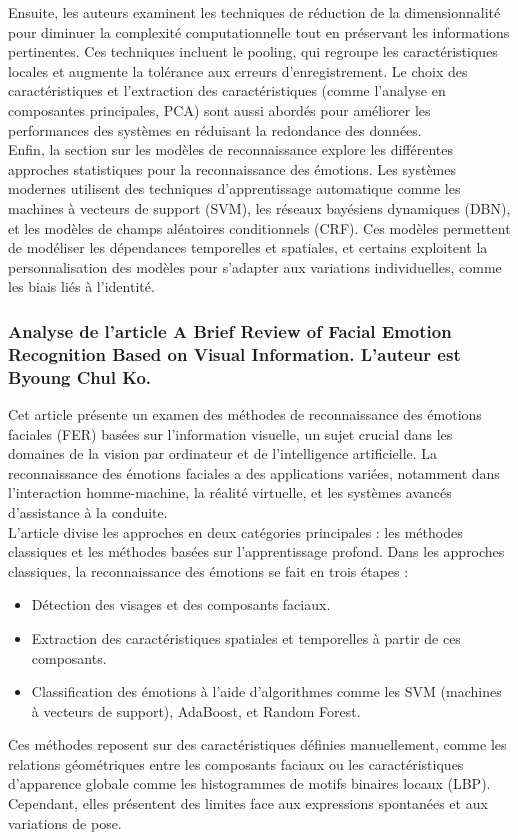 \documentclass{rapport}
\begin{document}
Ensuite, les auteurs examinent les techniques de réduction de la dimensionnalité
pour diminuer la complexité computationnelle tout en préservant les informations
pertinentes. Ces techniques incluent le pooling, qui regroupe les caractéristiques
locales et augmente la tolérance aux erreurs d'enregistrement. Le choix des
caractéristiques et l'extraction des caractéristiques (comme l'analyse en
composantes principales, PCA) sont aussi abordés pour améliorer les performances
des systèmes en réduisant la redondance des données.\\

Enfin, la section sur les modèles de reconnaissance explore les différentes
approches statistiques pour la reconnaissance des émotions. Les systèmes modernes
utilisent des techniques d'apprentissage automatique comme les machines à vecteurs
de support (SVM), les réseaux bayésiens dynamiques (DBN), et les modèles de champs
aléatoires conditionnels (CRF). Ces modèles permettent de modéliser les dépendances
temporelles et spatiales, et certains exploitent la personnalisation des modèles
pour s’adapter aux variations individuelles, comme les biais liés à l'identité.

\subsubsection{Analyse de l'article \cite{koBriefReviewFacial2018} A Brief Review of Facial Emotion Recognition Based on Visual Information. L'auteur est Byoung Chul Ko.}

Cet article présente un examen des méthodes de reconnaissance des émotions faciales
(FER) basées sur l'information visuelle, un sujet crucial dans les domaines de la
vision par ordinateur et de l'intelligence artificielle. La reconnaissance des
émotions faciales a des applications variées, notamment dans l'interaction
homme-machine, la réalité virtuelle, et les systèmes avancés d'assistance à la conduite.\\

L'article divise les approches en deux catégories principales : les méthodes classiques
et les méthodes basées sur l'apprentissage profond. Dans les approches classiques,
la reconnaissance des émotions se fait en trois étapes :
\begin{itemize}
    \item Détection des visages et des composants faciaux.
    \item Extraction des caractéristiques spatiales et temporelles à partir de ces composants.
    \item Classification des émotions à l'aide d'algorithmes comme les SVM (machines à vecteurs de support), AdaBoost, et Random Forest.
\end{itemize}
Ces méthodes reposent sur des caractéristiques définies manuellement, comme les
relations géométriques entre les composants faciaux ou les caractéristiques
d'apparence globale comme les histogrammes de motifs binaires locaux (LBP).
Cependant, elles présentent des limites face aux expressions spontanées et aux variations de pose.\\
\end{document}
